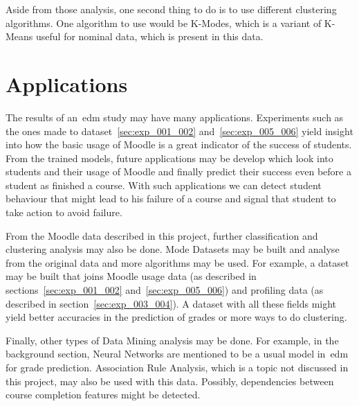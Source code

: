 Aside from those analysis, one second thing to do is to use different
clustering algorithms. One algorithm to use would be K-Modes, which is a
variant of K-Means useful for nominal data, which is present in this data.

\section{Applications}

The results of an~\gls{edm} study may have many applications. Experiments such
as the ones made to dataset~\ref{sec:exp_001_002} and~\ref{sec:exp_005_006}
yield insight into how the basic usage of Moodle is a great indicator of the
success of students. From the trained models, future applications may be
develop which look into students and their usage of Moodle and finally predict
their success even before a student as finished a course. With such
applications we can detect student behaviour that might lead to his failure of
a course and signal that student to take action to avoid failure.

From the Moodle data described in this project, further classification and
clustering analysis may also be done. Mode Datasets may be built and analyse from
the original data and more algorithms may be used. For example, a dataset may
be built that joins Moodle usage data (as described in
sections~\ref{sec:exp_001_002} and~\ref{sec:exp_005_006}) and profiling data
(as described in section~\ref{sec:exp_003_004}). A dataset with all these
fields might yield better accuracies in the prediction of grades or more ways
to do clustering.

Finally, other types of Data Mining analysis may be done. For example, in the
background section, Neural Networks are mentioned to be a usual model
in~\gls{edm} for grade prediction. Association Rule Analysis, which is a topic
not discussed in this project, may also be used with this data. Possibly,
dependencies between course completion features might be detected.
